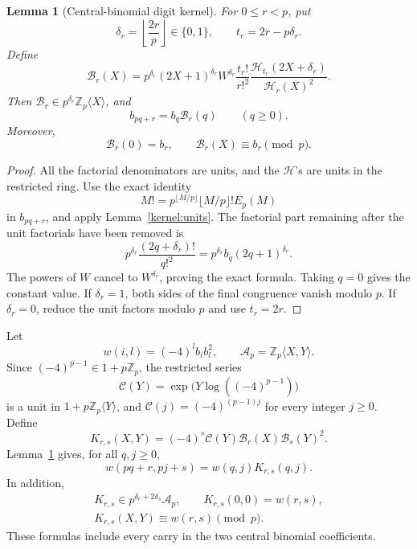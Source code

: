 \documentclass[11pt,a4paper]{article}
\newtheorem{lemma}[theorem]{Lemma}
\theoremstyle{remark}\newtheorem{remark}[theorem]{Remark}
\newcommand{\Z}{\mathbb Z}\newcommand{\Q}{\mathbb Q}
\begin{document}
\begin{lemma}[Central-binomial digit kernel]\label{kernel:central}
For \(0\le r<p\), put
\[
 \delta_r=\left\lfloor\frac{2r}{p}\right\rfloor\in\{0,1\},
 \qquad t_r=2r-p\delta_r.
\]
Define
\[
 \mathcal B_r(X)=
 p^{\delta_r}(2X+1)^{\delta_r}W^{\delta_r}
 \frac{t_r!}{r!^2}
 \frac{\mathcal H_{t_r}(2X+\delta_r)}{\mathcal H_r(X)^2}.
\]
Then \(\mathcal B_r\in p^{\delta_r}\Z_p\langle X\rangle\), and
\[
 b_{pq+r}=b_q\mathcal B_r(q)\qquad(q\ge0).
\]
Moreover,
\[
 \mathcal B_r(0)=b_r,\qquad
 \mathcal B_r(X)\equiv b_r\pmod p.
\]
\end{lemma}
\begin{proof}
All the factorial denominators are units, and the \(\mathcal H\)'s are
units in the restricted ring. Use the exact identity
\[
 M!=p^{\lfloor M/p\rfloor}\lfloor M/p\rfloor!E_p(M)
\]
in \(b_{pq+r}\), and apply Lemma~\ref{kernel:units}. The factorial part
remaining after the unit factorials have been removed is
\[
 p^{\delta_r}\frac{(2q+\delta_r)!}{q!^2}
       =p^{\delta_r}b_q(2q+1)^{\delta_r}.
\]
The powers of \(W\) cancel to \(W^{\delta_r}\), proving the exact formula.
Taking \(q=0\) gives the constant value.
If \(\delta_r=1\), both sides of the final congruence vanish modulo \(p\).
If \(\delta_r=0\), reduce the unit factors modulo \(p\) and use
\(t_r=2r\).
\end{proof}

Let
\[
 w(i,l)=(-4)^l b_i b_l^2,\qquad
 \mathcal A_p=\Z_p\langle X,Y\rangle.
\]
Since \((-4)^{p-1}\in1+p\Z_p\), the restricted series
\[
 \mathcal C(Y)=\exp\bigl(Y\log((-4)^{p-1})\bigr)
\]
is a unit in \(1+p\Z_p\langle Y\rangle\), and
\(\mathcal C(j)=(-4)^{(p-1)j}\) for every integer \(j\ge0\).
Define
\begin{equation}\label{kernel:double}
 K_{r,s}(X,Y)=(-4)^s\mathcal C(Y)
                      \mathcal B_r(X)\mathcal B_s(Y)^2.
\end{equation}
Lemma~\ref{kernel:central} gives, for all \(q,j\ge0\),
\begin{equation}\label{kernel:exact}
 w(pq+r,pj+s)=w(q,j)K_{r,s}(q,j).
\end{equation}
In addition,
\begin{equation}\label{kernel:properties}
 \begin{gathered}
 K_{r,s}\in p^{\delta_r+2\delta_s}\mathcal A_p,\qquad
 K_{r,s}(0,0)=w(r,s),\\
 K_{r,s}(X,Y)\equiv w(r,s)\pmod p.
 \end{gathered}
\end{equation}
These formulas include every carry in the two central binomial coefficients.
\end{document}
